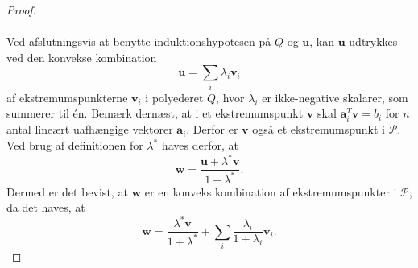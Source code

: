 \begin{proof}
\\\\
Ved afslutningsvis at benytte induktionshypotesen på $Q$ og $\textbf{u}$, kan $\textbf{u}$ udtrykkes ved den konvekse kombination
$$\textbf{u}=\sum_{i}\lambda_{i}\textbf{v}_i$$
af ekstremumspunkterne $\textbf{v}_i$ i polyederet $Q$, hvor $\lambda_i$ er ikke-negative skalarer, som summerer til én.
Bemærk dernæst, at i et ekstremumspunkt $\textbf{v}$ skal $\mathbf{a}_{i}^{T} \textbf{v}=b_{i}$ for $n$ antal lineært uafhængige vektorer $\textbf{a}_i$. 
Derfor er  $\textbf{v}$ også et ekstremumspunkt i $\mathcal{P}$. 
Ved brug af definitionen for $\lambda^*$ haves derfor, at 
$$ \textbf{w}=\frac{\textbf{u}+\lambda^*\textbf{v}}{1+\lambda^*}.$$
Dermed er det bevist, at $\textbf{w}$ er en konveks kombination af ekstremumspunkter i $\mathcal{P}$, da det haves, at 
$$\textbf{w}=\frac{\lambda^*\textbf{v}}{1+\lambda^*}+\sum_{i}\frac{\lambda_i}{1+\lambda_i}\textbf{v}_i.$$
\end{proof}
